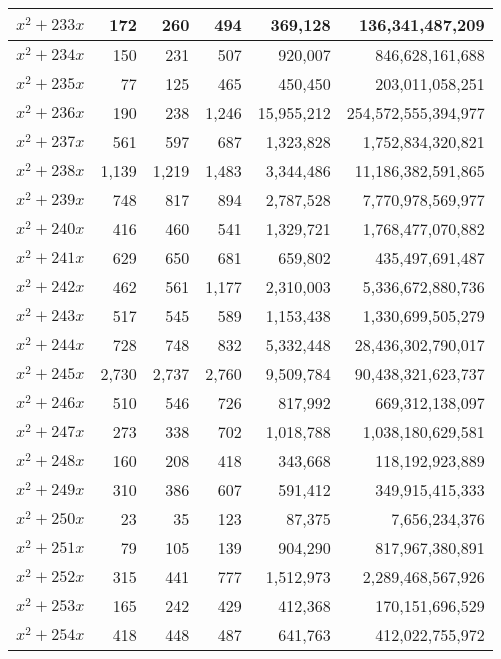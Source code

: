 \documentclass{article}
\begin{document}
\begin{center}
\begin{tabular}{ | c | r | r | r | r | r | }
$x^2 + 233x$ & 172 & 260 & 494 & 369{,}128 & 136{,}341{,}487{,}209 \\ \hline
$x^2 + 234x$ & 150 & 231 & 507 & 920{,}007 & 846{,}628{,}161{,}688 \\ \hline
$x^2 + 235x$ & 77 & 125 & 465 & 450{,}450 & 203{,}011{,}058{,}251 \\ \hline
$x^2 + 236x$ & 190 & 238 & 1{,}246 & 15{,}955{,}212 & 254{,}572{,}555{,}394{,}977 \\ \hline
$x^2 + 237x$ & 561 & 597 & 687 & 1{,}323{,}828 & 1{,}752{,}834{,}320{,}821 \\ \hline
$x^2 + 238x$ & 1{,}139 & 1{,}219 & 1{,}483 & 3{,}344{,}486 & 11{,}186{,}382{,}591{,}865 \\ \hline
$x^2 + 239x$ & 748 & 817 & 894 & 2{,}787{,}528 & 7{,}770{,}978{,}569{,}977 \\ \hline
$x^2 + 240x$ & 416 & 460 & 541 & 1{,}329{,}721 & 1{,}768{,}477{,}070{,}882 \\ \hline
$x^2 + 241x$ & 629 & 650 & 681 & 659{,}802 & 435{,}497{,}691{,}487 \\ \hline
$x^2 + 242x$ & 462 & 561 & 1{,}177 & 2{,}310{,}003 & 5{,}336{,}672{,}880{,}736 \\ \hline
$x^2 + 243x$ & 517 & 545 & 589 & 1{,}153{,}438 & 1{,}330{,}699{,}505{,}279 \\ \hline
$x^2 + 244x$ & 728 & 748 & 832 & 5{,}332{,}448 & 28{,}436{,}302{,}790{,}017 \\ \hline
$x^2 + 245x$ & 2{,}730 & 2{,}737 & 2{,}760 & 9{,}509{,}784 & 90{,}438{,}321{,}623{,}737 \\ \hline
$x^2 + 246x$ & 510 & 546 & 726 & 817{,}992 & 669{,}312{,}138{,}097 \\ \hline
$x^2 + 247x$ & 273 & 338 & 702 & 1{,}018{,}788 & 1{,}038{,}180{,}629{,}581 \\ \hline
$x^2 + 248x$ & 160 & 208 & 418 & 343{,}668 & 118{,}192{,}923{,}889 \\ \hline
$x^2 + 249x$ & 310 & 386 & 607 & 591{,}412 & 349{,}915{,}415{,}333 \\ \hline
$x^2 + 250x$ & 23 & 35 & 123 & 87{,}375 & 7{,}656{,}234{,}376 \\ \hline
$x^2 + 251x$ & 79 & 105 & 139 & 904{,}290 & 817{,}967{,}380{,}891 \\ \hline
$x^2 + 252x$ & 315 & 441 & 777 & 1{,}512{,}973 & 2{,}289{,}468{,}567{,}926 \\ \hline
$x^2 + 253x$ & 165 & 242 & 429 & 412{,}368 & 170{,}151{,}696{,}529 \\ \hline
$x^2 + 254x$ & 418 & 448 & 487 & 641{,}763 & 412{,}022{,}755{,}972 \\ \hline

\end{tabular}
\end{center}
\end{document}
